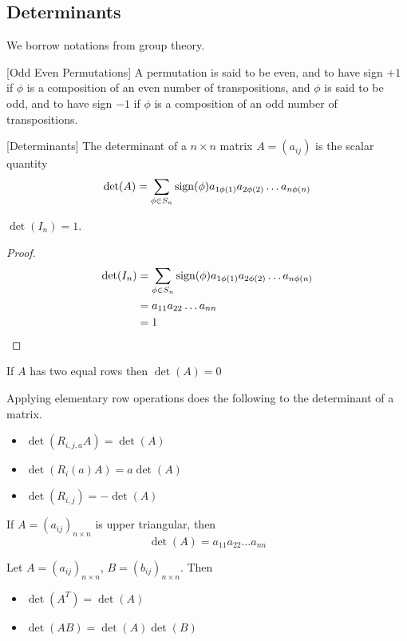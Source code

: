 \documentclass[a4paper]{article}
\begin{document}
\subsection{Determinants}
We borrow notations from group theory. 
\begin{defn}{}{}[Odd Even Permutations] A permutation is said to be even, and to have sign $+1$ if $\phi$ is a composition of an even number of transpositions, and $\phi$ is said to be odd, and to have sign $-1$ if $\phi$ is a composition of an odd number of transpositions. 
\end{defn}

\begin{defn}{}{}[Determinants] The determinant of a $n\times n$ matrix $A=(a_{ij})$ is the scalar quantity $$\det(A)=\sum_{\phi\in S_n}\operatorname{sign}(\phi)a_{1\phi(1)}a_{2\phi(2)}\dots a_{n\phi(n)}$$
\end{defn}

\begin{lmm}{}{} $\det(I_n)=1$. 
\end{lmm}
\begin{proof} 
\begin{align*}
\det(I_n)&=\sum_{\phi\in S_n}\operatorname{sign}(\phi)a_{1\phi(1)}a_{2\phi(2)}\dots a_{n\phi(n)}\\
&=a_{11}a_{22}\dots a_{nn}\\
&=1
\end{align*}
\end{proof}

\begin{prp}{}{} If $A$ has two equal rows then $\det(A)=0$
\end{prp}

\begin{prp}{}{} Applying elementary row operations does the following to the determinant of a matrix. 
\begin{itemize}
\item $\det(R_{i,j,a}A)=\det(A)$
\item $\det(R_{i}(a)A)=a\det(A)$
\item $\det(R_{i,j})=-\det(A)$
\end{itemize}
\end{prp}

\begin{prp}{}{} If $A=(a_{ij})_{n\times n}$ is upper triangular, then $$\det(A)=a_{11}a_{22}\dots a_{nn}$$
\end{prp}

\begin{prp}{}{} Let $A=(a_{ij})_{n\times n}$, $B=(b_{ij})_{n\times n}$. Then 
\begin{itemize}
\item $\det(A^T)=\det(A)$
\item $\det(AB)=\det(A)\det(B)$
\end{itemize}
\end{prp}
\end{document}
